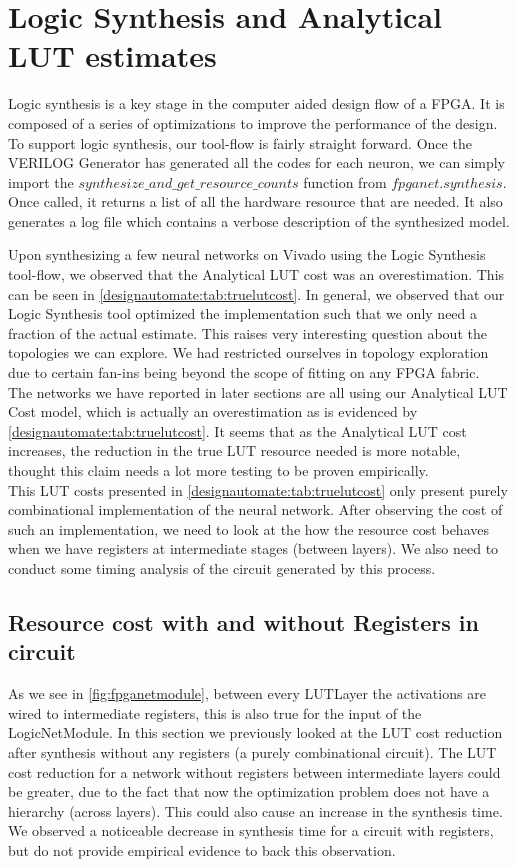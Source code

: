 \section{Logic Synthesis and Analytical LUT estimates}
Logic synthesis is a key stage in the computer aided design flow of a FPGA. It is composed of a series of optimizations to improve the performance of the design. To support logic synthesis, our tool-flow is fairly straight forward. Once the VERILOG Generator has generated all the codes for each neuron, we can simply import the $synthesize\_and\_get\_resource\_counts$ function from $fpganet.synthesis$. Once called, it returns a list of all the hardware resource that are needed. It also generates a log file which contains a verbose description of the synthesized model. 

Upon synthesizing a few neural networks on Vivado using the Logic Synthesis tool-flow, we observed that the Analytical LUT cost was an overestimation. This can be seen in \cref{designautomate:tab:truelutcost}. In general, we observed that our Logic Synthesis tool optimized the implementation such that we only need a fraction of the actual estimate. This raises very interesting question about the topologies we can explore. We had restricted ourselves in topology exploration due to certain fan-ins being beyond the scope of fitting on any FPGA fabric. \\
The networks we have reported in later sections are all using our Analytical LUT Cost model, which is actually an overestimation as is evidenced by \cref{designautomate:tab:truelutcost}. It seems that as the Analytical LUT cost increases, the reduction in the true LUT resource needed is more notable, thought this claim needs a lot more testing to be proven empirically. \\
This LUT costs presented in \cref{designautomate:tab:truelutcost} only present purely combinational implementation of the neural network. After observing the cost of such an implementation, we need to look at the how the resource cost behaves when we have registers at intermediate stages (between layers). We also need to conduct some timing analysis of the circuit generated by this process.

\subsection{Resource cost with and without Registers in circuit}
As we see in \cref{fig:fpganetmodule}, between every LUTLayer the activations are wired to intermediate registers, this is also true for the input of the LogicNetModule. In this section we previously looked at the LUT cost reduction after synthesis without any registers (a purely combinational circuit). The LUT cost reduction for a network without registers between intermediate layers could be greater, due to the fact that now the optimization problem does not have a hierarchy (across layers). This could also cause an increase in the synthesis time. We observed a noticeable decrease in synthesis time for a circuit with registers, but do not provide empirical evidence to back this observation. 


